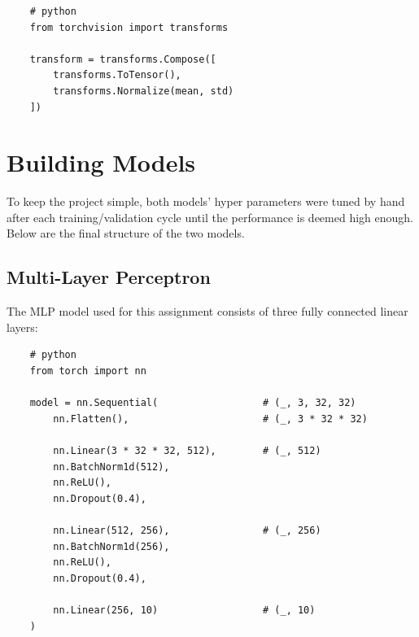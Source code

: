 \documentclass{report}
\begin{document}
\newpage
\begin{verbatim}
    # python
    from torchvision import transforms

    transform = transforms.Compose([
        transforms.ToTensor(),
        transforms.Normalize(mean, std)
    ])
\end{verbatim}

\section{Building Models}
To keep the project simple, both models' hyper parameters were tuned by hand after each training/validation 
cycle until the performance is deemed high enough. Below are the final structure of the two models.

\subsection{Multi-Layer Perceptron}
The MLP model used for this assignment consists of three fully connected linear layers:

\begin{verbatim}
    # python
    from torch import nn

    model = nn.Sequential(                  # (_, 3, 32, 32)
        nn.Flatten(),                       # (_, 3 * 32 * 32)

        nn.Linear(3 * 32 * 32, 512),        # (_, 512)
        nn.BatchNorm1d(512),
        nn.ReLU(),
        nn.Dropout(0.4),

        nn.Linear(512, 256),                # (_, 256)
        nn.BatchNorm1d(256),
        nn.ReLU(),
        nn.Dropout(0.4),

        nn.Linear(256, 10)                  # (_, 10)
    )
\end{verbatim}
\end{document}
